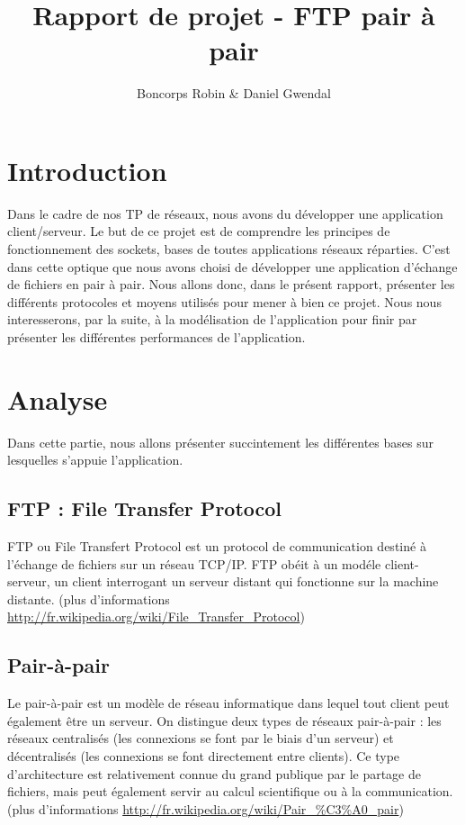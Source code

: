\documentclass[a4paper, 11pt, french]{report}
\author{Boncorps Robin \& Daniel Gwendal}
\title{Rapport de projet - FTP pair à pair}
\begin{document}
\maketitle

\chapter{Introduction} %
Dans le cadre de nos TP de réseaux, nous avons du développer une application client/serveur. Le but de ce projet est de comprendre les principes de fonctionnement des sockets, bases de toutes applications réseaux réparties. C'est dans cette optique que nous avons choisi de développer une application d'échange de fichiers en pair à pair. Nous allons donc, dans le présent rapport, présenter les différents protocoles et moyens utilisés pour mener à bien ce projet. Nous nous interesserons, par la suite, à la modélisation de l'application pour finir par présenter les différentes performances de l'application.

\chapter{Analyse}
Dans cette partie, nous allons présenter succintement les différentes bases sur lesquelles s'appuie l'application.

	\section{FTP : File Transfer Protocol} %
	FTP ou File Transfert Protocol est un protocol de communication destiné à l'échange de fichiers sur un réseau TCP/IP.
	FTP obéit à un modéle client-serveur, un client interrogant un serveur distant qui fonctionne sur la machine distante. (plus d'informations \url{http://fr.wikipedia.org/wiki/File_Transfer_Protocol})
		
	\section{Pair-à-pair} %
	Le pair-à-pair est un modèle de réseau informatique dans lequel tout client peut également être un serveur. On distingue deux types de réseaux pair-à-pair : les réseaux centralisés (les connexions se font par le biais d'un serveur) et décentralisés (les connexions se font directement entre clients). Ce type d'architecture est relativement connue du grand publique par le partage de fichiers, mais peut également servir au calcul scientifique ou à la communication. (plus d'informations \url{http://fr.wikipedia.org/wiki/Pair_%C3%A0_pair})
	
\end{document}
